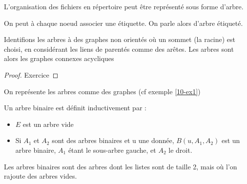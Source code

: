 \begin{example}
	L'organisation des fichiers en répertoire peut être représenté sous forme d'arbre.
\end{example}

\begin{rem}
	On peut à chaque noeud associer une étiquette. On parle alors d'arbre étiqueté.
\end{rem}

\begin{theorem}
	Identifions les arbres à des graphes non orientés où un sommet (la racine) est choisi, en considérant les liens de parentés comme des arêtes. Les arbres sont alors les graphes connexes acycliques
	\label{10-graphe}
\end{theorem}
\begin{proof}
	Exercice
\end{proof}

\begin{corollary}
	On représente les arbres comme des graphes (cf exemple \ref{10-ex1})
\end{corollary}

\begin{definition}
	Un arbre binaire est définit inductivement par :
	\begin{itemize}
		\item $E$ est un arbre vide
		\item Si $A_1$ et $A_2$ sont des arbres binaires et u une donnée, $B(u, A_1, A_2)$ est un arbre binaire, $A_1$ étant le sous-arbre gauche, et $A_2$ le droit.
	\end{itemize}
\end{definition}

\begin{idee}
	Les arbres binaires sont des arbres dont les listes sont de taille 2, mais où l'on rajoute des arbres vides.
\end{idee}

